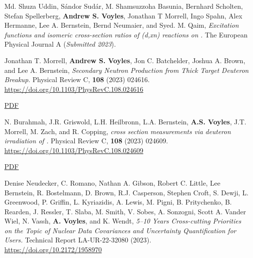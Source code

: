 \begin{bibsection}

\item Md. Shuza Uddin, Sándor Sudár, M. Shamsuzzoha Basunia, Bernhard Scholten, Stefan Spellerberg, \textbf{Andrew S. Voyles}, Jonathan T Morrell, Ingo Spahn, Alex Hermanne, Lee A. Bernstein, Bernd Neumaier, and Syed. M. Qaim, \emph{ Excitation functions and isomeric cross-section ratios of (d,xn) reactions on .} The European Physical Journal A  (\emph{Submitted 2023}). %


\item Jonathan T. Morrell, \textbf{Andrew S. Voyles}, Jon C. Batchelder, Joshua A. Brown, and Lee A. Bernstein, \emph{Secondary Neutron Production from Thick Target Deuteron Breakup.} Physical Review C, \textbf{108} (2023) 024616. \url{https://doi.org/10.1103/PhysRevC.108.024616} 

\ifshort \vspace{0.1cm} \href{https://avoyles.github.io/papers/Morrell2023_dbreakup.pdf}{\underline{PDF}} \else  \fi 


\item N. Burahmah, J.R. Griswold, L.H. Heilbronn, L.A. Bernstein,  \textbf{A.S. Voyles}, J.T. Morrell, M. Zach, and R. Copping, \emph{     cross section measurements via deuteron irradiation of  .} Physical Review C, \textbf{108} (2023) 024609. \url{https://doi.org/10.1103/PhysRevC.108.024609} 

\ifshort \vspace{0.1cm} \href{https://avoyles.github.io/papers/Buramah2023_229Pa_deuterons.pdf}{\underline{PDF}} \else  \fi 


\item Denise Neudecker, C. Romano, Nathan A. Gibson, Robert C. Little, Lee Bernstein, R. Bostelmann, D. Brown, R.J. Casperson, Stephen Croft, S. Dewji, L. Greenwood, P. Griffin, L. Kyriazidis, A. Lewis, M. Pigni, B. Pritychenko, B. Rearden, J. Ressler, T. Slaba, M. Smith, V. Sobes, A. Sonzogni, Scott A. Vander Wiel, N. Vassh, \textbf{A.  Voyles}, and K. Wendt, \emph{5--10 Years Cross-cutting Priorities on the Topic of Nuclear Data Covariances and Uncertainty Quantification for Users.} Technical Report LA-UR-22-32080  (2023). \url{https://doi.org/10.2172/1958970} 


\end{bibsection}
